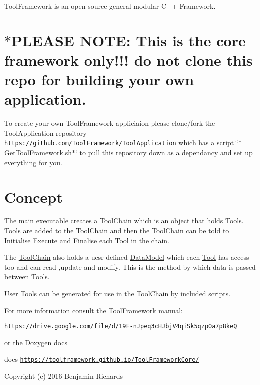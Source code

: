

Tool\-Framework is an open source general modular C++ Framework.

\section*{$\ast$\-P\-L\-E\-A\-S\-E N\-O\-T\-E\-: This is the core framework only!!! do not clone this repo for building your own application.}

To create your own Tool\-Framework appliciaion please clone/fork the Tool\-Application repository \href{https://github.com/ToolFramework/ToolApplication}{\tt https\-://github.\-com/\-Tool\-Framework/\-Tool\-Application} which has a script \char`\"{}$\ast$\-Get\-Tool\-Framework.\-sh$\ast$\char`\"{} to pull this repository down as a dependancy and set up everything for you.



 \section*{Concept}





The main executable creates a \hyperlink{classToolChain}{Tool\-Chain} which is an object that holds Tools. Tools are added to the \hyperlink{classToolChain}{Tool\-Chain} and then the \hyperlink{classToolChain}{Tool\-Chain} can be told to Initialise Execute and Finalise each \hyperlink{classTool}{Tool} in the chain.

The \hyperlink{classToolChain}{Tool\-Chain} also holds a uesr defined \hyperlink{classDataModel}{Data\-Model} which each \hyperlink{classTool}{Tool} has access too and can read ,update and modify. This is the method by which data is passed between Tools.

User Tools can be generated for use in the \hyperlink{classToolChain}{Tool\-Chain} by included scripts.

For more information consult the Tool\-Framework manual\-:

\href{https://drive.google.com/file/d/19F-nJpeq3cHJbjV4qiSk5qzpOa7p8keQ}{\tt https\-://drive.\-google.\-com/file/d/19\-F-\/n\-Jpeq3c\-H\-Jbj\-V4qi\-Sk5qzp\-Oa7p8ke\-Q}

or the Doxygen docs

docs \href{https://toolframework.github.io/ToolFrameworkCore/}{\tt https\-://toolframework.\-github.\-io/\-Tool\-Framework\-Core/}

Copyright (c) 2016 Benjamin Richards 